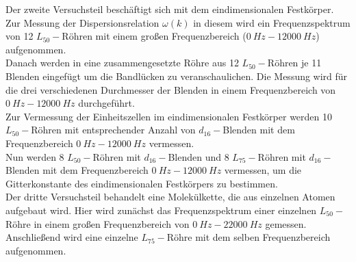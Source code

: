 %
Der zweite Versuchsteil beschäftigt sich mit dem eindimensionalen Festkörper.
Zur Messung der Dispersionsrelation $\omega(k)$ in diesem wird ein Frequenzspektrum von 12 $L_{50}-$Röhren mit einem großen Frequenzbereich ($\SI{0}{Hz}-\SI{12000}{Hz}$) aufgenommen.\\
%
Danach werden in eine zusammengesetzte Röhre aus 12 $L_{50}-$Röhren je 11 Blenden eingefügt um die Bandlücken zu veranschaulichen.
Die Messung wird für die drei verschiedenen Durchmesser der Blenden in einem Frequenzbereich von $\SI{0}{Hz}-\SI{12000}{Hz}$ durchgeführt.\\
%
Zur Vermessung der Einheitszellen im eindimensionalen Festkörper werden 10 $L_{50}-$Röhren mit entsprechender Anzahl von $d_{16}-$Blenden mit dem Frequenzbereich $\SI{0}{Hz}-\SI{12000}{Hz}$ vermessen.\\
%
Nun werden 8 $L_{50}-$Röhren mit $d_{16}-$Blenden und 8 $L_{75}-$Röhren mit $d_{16}-$Blenden mit dem Frequenzbereich $\SI{0}{Hz}-\SI{12000}{Hz}$ vermessen, um die Gitterkonstante des eindimensionalen Festkörpers zu bestimmen.\\
%
Der dritte Versuchsteil behandelt eine Molekülkette, die aus einzelnen Atomen aufgebaut wird.
Hier wird zunächst das Frequenzspektrum einer einzelnen $L_{50}-$Röhre in einem großen Frequenzbereich von $\SI{0}{Hz}-\SI{22000}{Hz}$ gemessen.\\
%
Anschließend wird eine einzelne $L_{75}-$Röhre mit dem selben Frequenzbereich aufgenommen.\\
%

